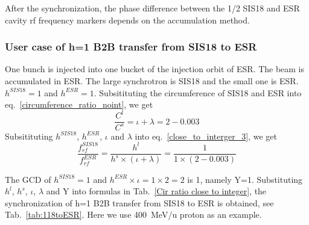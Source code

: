 After the synchronization, the phase difference between the 1/2 SIS18 and ESR cavity rf frequency markers depends on the accumulation method.

\subsubsection{User case of h=1 B2B transfer from SIS18 to ESR} 
One bunch is injected into one bucket of the injection orbit of ESR. The beam is accumulated in ESR. The large synchrotron is SIS18 and the small one is ESR. $h^{SIS18}=1$ and $h^{ESR}=1$. Subsitituting the circumference of SIS18 and ESR into eq.~\ref{circumference_ratio_noint}, we get
\begin{equation}
\frac{C^l}{C^s}=\iota + \lambda =2-0.003
\end{equation}
Subsitituting $h^{SIS18}$, $h^{ESR}$, $\iota$ and $\lambda$ into eq.~\ref{close_to_interger_3}, we get
\begin{equation}
\frac {f_{rf}^{SIS18}}{f_{rf}^{ESR}}= \frac{h^l}{h^s \times (\iota+ \lambda)}=\frac {1}{1 \times(2-0.003)}
\end{equation}

The GCD of $h^{SIS18}=1$ and $h^{ESR}\times \iota=1\times 2=2$ is 1, namely Y=1.  Substituting $h^l$, $h^s$, $\iota$, $\lambda$ and Y into formulas in Tab.~\ref{Cir ratio close to integer}, the synchronization of h=1 B2B transfer from SIS18 to ESR is obtained, see Tab.~\ref{tab:118toESR}. Here we use \SI{400}{MeV/\atomicmassunit} proton as an example. 

